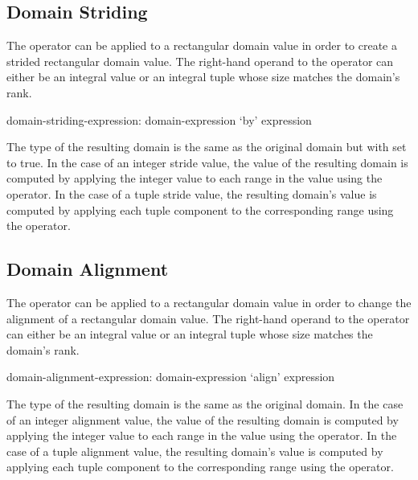 \subsection{Domain Striding}
\label{Domain_Striding}

The  operator can be applied to a rectangular domain value in
order to create a strided rectangular domain value.  The right-hand
operand to the  operator can either be an integral value or
an integral tuple whose size matches the domain's rank.

\begin{syntax}
domain-striding-expression:
  domain-expression `by' expression
\end{syntax}

The type of the resulting domain is the same as the original domain
but with  set to true.  In the case of an integer
stride value, the value of the resulting domain is computed by
applying the integer value to each range in the value using the
 operator.  In the case of a tuple stride value, the resulting
domain's value is computed by applying each tuple component to the
corresponding range using the  operator.


\subsection{Domain Alignment}
\label{Domain_Alignment}

The  operator can be applied to a rectangular domain value in
order to change the alignment of a rectangular domain value.  The right-hand
operand to the  operator can either be an integral value or
an integral tuple whose size matches the domain's rank.

\begin{syntax}
domain-alignment-expression:
  domain-expression `align' expression
\end{syntax}

The type of the resulting domain is the same as the original domain.
In the case of an integer alignment value, the value of the resulting
domain is computed by applying the integer value to each range in the
value using the  operator.  In the case of a tuple
alignment value, the resulting domain's value is computed by applying
each tuple component to the corresponding range using the 
operator.


